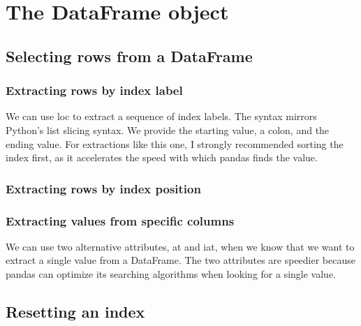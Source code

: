 \chapter{The DataFrame object\label{Ch04}}
\section{Selecting rows from a DataFrame}
\subsection{Extracting rows by index label}
We can use loc to extract a sequence of index labels. The syntax mirrors Python’s list slicing syntax. We provide the starting value, a colon, and the ending value. For extractions like this one, I strongly recommended sorting the index first, as it accelerates the speed with which pandas finds the value.
\subsection{Extracting rows by index position}

\subsection{Extracting values from specific columns}
We can use two alternative attributes, at and iat, when we know that we want to extract a single value from a DataFrame. The two attributes are speedier because pandas can optimize its searching algorithms when looking for a single value.
\section{Resetting an index}
